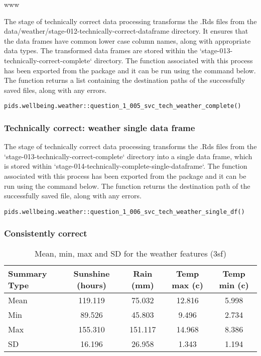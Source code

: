 www\documentclass[12pt, oneside, openany]{book}
\begin{document}
The stage of technically correct data processing transforms the .Rds files from the data/weather/stage-012-technically-correct-dataframe directory. It ensures that the data frames have common lower case column names, along with appropriate data types. The transformed data frames are stored within the `stage-013-technically-correct-complete` directory. The function associated with this process has been exported from the package and it can be run using the command below. The function returns a list containing the destination paths of the successfully saved files, along with any errors.

\begin{verbatim}
pids.wellbeing.weather::question_1_005_svc_tech_weather_complete()
\end{verbatim}

\subsubsection*{Technically correct: weather single data frame}

The stage of technically correct data processing transforms the .Rds files from the `stage-013-technically-correct-complete` directory into a single data frame, which is stored within `stage-014-technically-complete-single-dataframe`. The function associated with this process has been exported from the package and it can be run using the command below. The function returns the destination path of the successfully saved file, along with any errors.

\begin{verbatim}
pids.wellbeing.weather::question_1_006_svc_tech_weather_single_df()
\end{verbatim}

\subsubsection*{Consistently correct}

\begin{table}[h!]
	\centering
	\begin{tabular}{ |l|c|c|c|c| }
		\hline
		Summary Type & Sunshine (hours) & Rain (mm) & Temp max (c) & Temp min (c)\\
		\hline
		\hline
		Mean & 119.119  & 75.032  & 12.816 & 5.998 \\
		Min & 89.526  & 45.803  & 9.496   & 2.734 \\
		Max & 155.310 & 151.117  & 14.968  & 8.386 \\
		SD & 16.196  & 26.958   & 1.343  & 1.194 \\
		\hline
	\end{tabular}
	\caption{Mean, min, max and SD for the weather features (3sf)}
	\label{table:question_1_008_grouped_data_summary_non_scaled}
\end{table}
\end{document}
